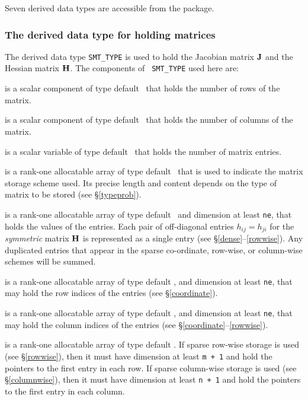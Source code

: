 \documentclass{galahad}
\begin{document}

\galtypes
Seven derived data types are accessible from the package.


\subsubsection{The derived data type for holding matrices}\label{typesmt}
The derived data type {\tt SMT\_TYPE} is used to hold the Jacobian
matrix ${\mathbf{J}}$ and the Hessian matrix ${\mathbf{H}}$. The components of {\tt
  SMT\_TYPE} used here are:

\begin{description}

 is a scalar component of type default \integer\ 
that holds the number of rows of the matrix. 

 is a scalar component of type default \integer\ 
that holds the number of columns of the matrix. 
 
 is a scalar variable of type default \integer\ that
holds the number of matrix entries.

 is a rank-one allocatable array of type default \character\ that
is used to indicate the matrix storage scheme used. Its precise length and
content depends on the type of matrix to be stored (see \S\ref{typeprob}).

\ittf{val} is a rank-one allocatable array of type default \realdp\, 
and dimension at least {\tt ne}, that holds the values of the entries. 
Each pair of off-diagonal entries $h_{ij} = h_{ji}$ for the {\em symmetric}
matrix ${\mathbf{H}}$ is represented as a single entry 
(see \S\ref{dense}--\ref{rowwise}).
Any duplicated entries that appear in the sparse 
co-ordinate, row-wise, or column-wise schemes will be summed. 

 is a rank-one allocatable array of type default \integer, 
and dimension at least {\tt ne}, that may hold the row indices of the entries 
(see \S\ref{coordinate}).

 is a rank-one allocatable array of type default \integer, 
and dimension at least {\tt ne}, that may hold the column indices of the entries
(see \S\ref{coordinate}--\ref{rowwise}).

 is a rank-one allocatable array of type default \integer.
If sparse row-wise storage is used (see \S\ref{rowwise}), then it
must have dimension at least {\tt m + 1} and hold the pointers to
the first entry in each row.  If sparse column-wise storage is used (see \S\ref{columnwise}), then it
must have dimension at least {\tt n + 1} and hold the pointers to
the first entry in each column.   

\end{description}
\end{document}
